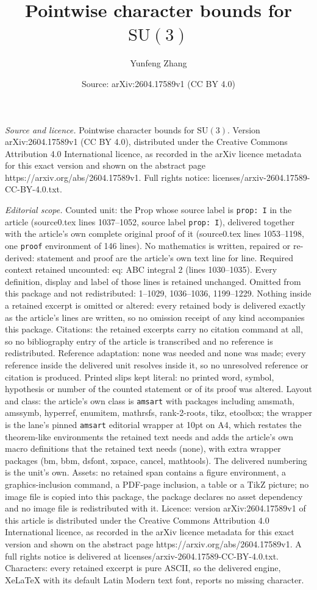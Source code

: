 \documentclass[10pt,a4paper]{amsart}
\title[Pointwise character bounds for $\mathrm{SU}(3)$]{Pointwise character bounds for $\mathrm{SU}(3)$}
\author{Yunfeng Zhang}
\date{Source: arXiv:2604.17589v1 (CC BY 4.0)}
\begin{document}
\maketitle

\noindent\emph{Source and licence.} Pointwise character bounds for $\mathrm{SU}(3)$. Version arXiv:2604.17589v1 (CC BY 4.0), distributed under the Creative Commons Attribution 4.0 International licence, as recorded in the arXiv licence metadata for this exact version and shown on the abstract page https://arxiv.org/abs/2604.17589v1. Full rights notice: licenses/arxiv-2604.17589-CC-BY-4.0.txt.\par\smallskip

\noindent\textit{Editorial scope.} Counted unit: the Prop whose source label is \texttt{prop: I} in the article (source0.tex lines 1037--1052, source label \texttt{prop: I}), delivered together with the article's own complete original proof of it (source0.tex lines 1053--1198, one \texttt{proof} environment of 146 lines). No mathematics is written, repaired or re-derived: statement and proof are the article's own text line for line. Required context retained uncounted: eq: ABC integral 2 (lines 1030--1035). Every definition, display and label of those lines is retained unchanged. Omitted from this package and not redistributed: 1--1029, 1036--1036, 1199--1229. Nothing inside a retained excerpt is omitted or altered: every retained body is delivered exactly as the article's lines are written, so no omission receipt of any kind accompanies this package. Citations: the retained excerpts carry no citation command at all, so no bibliography entry of the article is transcribed and no reference is redistributed. Reference adaptation: none was needed and none was made; every reference inside the delivered unit resolves inside it, so no unresolved reference or citation is produced. Printed slips kept literal: no printed word, symbol, hypothesis or number of the counted statement or of its proof was altered. Layout and class: the article's own class is \texttt{amsart} with packages including amsmath, amssymb, hyperref, enumitem, mathrsfs, rank-2-roots, tikz, etoolbox; the wrapper is the lane's pinned \texttt{amsart} editorial wrapper at 10pt on A4, which restates the theorem-like environments the retained text needs and adds the article's own macro definitions that the retained text needs (none), with extra wrapper packages (bm, bbm, dsfont, xspace, cancel, mathtools). The delivered numbering is the unit's own. Assets: no retained span contains a figure environment, a graphics-inclusion command, a PDF-page inclusion, a table or a TikZ picture; no image file is copied into this package, the package declares no asset dependency and no image file is redistributed with it. Licence: version arXiv:2604.17589v1 of this article is distributed under the Creative Commons Attribution 4.0 International licence, as recorded in the arXiv licence metadata for this exact version and shown on the abstract page https://arxiv.org/abs/2604.17589v1. A full rights notice is delivered at licenses/arxiv-2604.17589-CC-BY-4.0.txt. Characters: every retained excerpt is pure ASCII, so the delivered engine, XeLaTeX with its default Latin Modern text font, reports no missing character.
\end{document}
